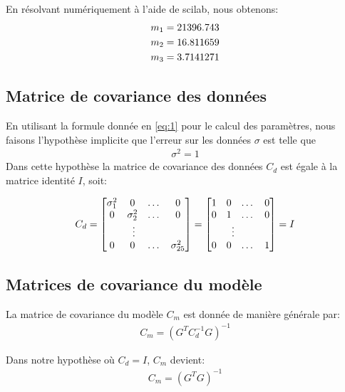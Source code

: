 \documentclass[12pt,a4paper]{extreport}
\begin{document}
En résolvant numériquement à l'aide de scilab, nous obtenons:
\begin{equation}
\begin{array}{c}
m_1 = 21396.743 \\[\jot] m_2 = 16.811659 \\[\jot] m_3 = 3.7141271
\end{array}
\end{equation}

\subsection*{Matrice de covariance des données}
En utilisant la formule donnée en \eqref{eq:1} pour le calcul des paramètres, nous faisons l'hypothèse implicite que l'erreur sur les données $\sigma$ est telle que 
\begin{gather}
\sigma^2 = 1
\end{gather}
Dans cette hypothèse la matrice de covariance des données $C_d$ est égale à la matrice identité $I$, soit:

\begin{gather}
	C_d =
	\begin{bmatrix}
	\sigma_1^2 & 0 & \dots & 0 \\
	0 & \sigma_2^2 & \dots & 0 \\
	\multicolumn{3}{c}{$\vdots$} \\
	0 & 0 & \dots & \sigma_{25}^2
	\end{bmatrix}
	=
	\begin{bmatrix}
	1 & 0 & \dots & 0 \\
	0 & 1 & \dots & 0 \\
	\multicolumn{3}{c}{$\vdots$} \\
	0 & 0 & \dots & 1 
	\end{bmatrix}
	= I
\end{gather}

\subsection*{Matrices de covariance du modèle}
La matrice de covariance du modèle $C_m$ est donnée de manière générale par:
\begin{gather}
	C_m = (G^TC_d^{-1}G)^{-1}
\end{gather}

Dans notre hypothèse où $C_d = I$, $C_m$ devient:
\begin{gather}
	C_m = (G^TG)^{-1}
\end{gather}
\end{document}
